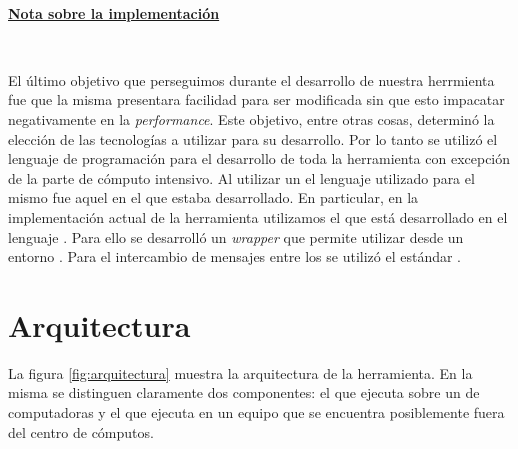 \

\noindent\underline{\textbf{Nota sobre la implementación}}

\

El último objetivo que perseguimos durante el desarrollo de nuestra herrmienta
fue que la misma presentara facilidad para ser modificada sin que esto
impacatar negativamente en la \emph{performance}. Este objetivo, entre otras
cosas, determinó la elección de las tecnologías a utilizar para su desarrollo.
Por lo tanto se utilizó el lenguaje de programación \Python para el desarrollo
de toda la herramienta con excepción de la parte de cómputo intensivo. Al
utilizar un \ssolver \ots el lenguaje utilizado para el mismo fue aquel en el
que estaba desarrollado. En particular, en la implementación actual de la
herramienta utilizamos el \ssolver \minisatdosveinte que está desarrollado en
el lenguaje \cpp. Para ello se desarrolló un \emph{wrapper} que permite
utilizar \minisat desde un entorno \Python. Para el intercambio de mensajes
entre los \ws se utilizó el estándar \mpi.



\section{Arquitectura}

La figura \ref{fig:arquitectura} muestra la arquitectura de la herramienta. En
la misma se distinguen claramente dos componentes: el \bend que ejecuta sobre
un \cluster de computadoras y el \fend que ejecuta en un equipo que se
encuentra posiblemente fuera del centro de cómputos.

